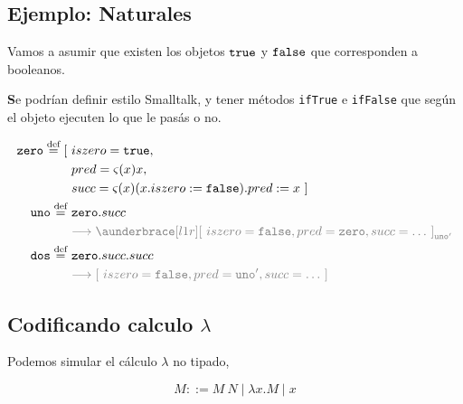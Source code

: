 \documentclass{report}
\theoremstyle{definition} %
\newenvironment{nota}[1]
    {\begin{leftbar}\textbf{#1}}
    {\end{leftbar}}
\newcommand{\eqdef}{\overset{\text{def}}{=}}
\newcommand{\app}[2]{#1 \ #2} %
\newcommand{\uabs}[2]{\lambda #1 . #2} %
\newcommand{\assign}[2]{#1 := #2}
\begin{document}
\subsection{Ejemplo: Naturales}

Vamos a asumir que existen los objetos $\text{\texttt{true}}$ y $\text{\texttt{false}}$ que corresponden a
booleanos.

\begin{nota}
    Se podrían definir estilo Smalltalk, y tener métodos \texttt{ifTrue} e
    \texttt{ifFalse} que según el objeto ejecuten lo que le pasás o no.
\end{nota}

\begin{align*}
    \oname{zero} \eqdef \obj{
        &\attr{iszero}{\true},\\
        &\attr{pred}{\met{x}{x}},\\
        &\attr{succ}{
            \met{x}
            {
                \assign
                {
                    \sel
                    {
                        (\assign{\sel{x}{iszero}}{\false})
                    }
                    {pred}
                }
                {x}    
            }
        }
    }\\
    \oname{uno} \eqdef\ &\sel{\oname{zero}}{succ}\\
    \quad &
    \textcolor{gray}
    {
        \bigreduce{}
        {
            \ubrace{
                \obj{
                    \attr{iszero}{\false},
                    \attr{pred}{\oname{zero}},
                    \attr{succ}{\dots}
                }
            }{\oname{uno}'}
        }
    }\\
    \oname{dos} \eqdef\ &\sel{\oname{zero}}{\sel{succ}{succ}}\\
    \quad &
    \textcolor{gray}
    {
        \bigreduce{}
        {
            \obj{
                \attr{iszero}{\false},
                \attr{pred}{\oname{uno}'},
                \attr{succ}{\dots}
            }
        }
    }
\end{align*}

\subsection{Codificando calculo $\lambda$}

\newcommand{\cod}[1]{\llbracket #1 \rrbracket } %

Podemos simular el cálculo $\lambda$ no tipado,

\[
    M ::= \app{M}{N} \mid \uabs{x}{M} \mid x
\]
\end{document}
